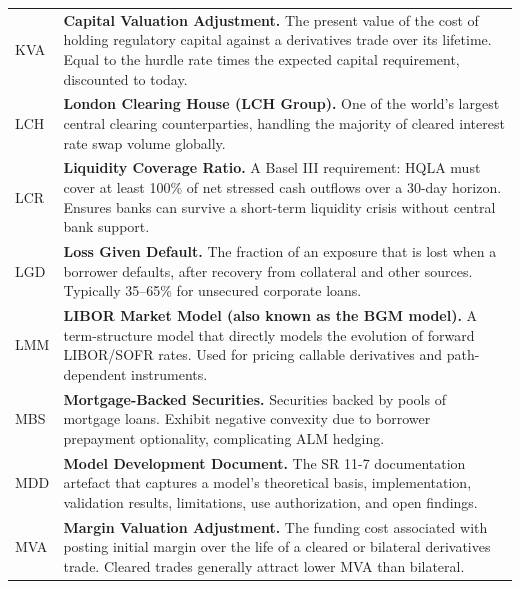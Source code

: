 \documentclass[12pt,a4paper]{article}
\begin{document}
\begin{longtable}{p{3.2cm} p{10.8cm}}
  KVA   & \textbf{Capital Valuation Adjustment.}
          The present value of the cost of holding regulatory capital against
          a derivatives trade over its lifetime.  Equal to the hurdle rate
          times the expected capital requirement, discounted to today. \\[4pt]

  LCH   & \textbf{London Clearing House (LCH Group).}
          One of the world's largest central clearing counterparties,
          handling the majority of cleared interest rate swap volume globally. \\[4pt]

  LCR   & \textbf{Liquidity Coverage Ratio.}
          A Basel III requirement: HQLA must cover at least 100\% of net
          stressed cash outflows over a 30-day horizon.  Ensures banks can
          survive a short-term liquidity crisis without central bank support. \\[4pt]

  LGD   & \textbf{Loss Given Default.}
          The fraction of an exposure that is lost when a borrower defaults,
          after recovery from collateral and other sources.  Typically
          35--65\% for unsecured corporate loans. \\[4pt]

  LMM   & \textbf{LIBOR Market Model (also known as the BGM model).}
          A term-structure model that directly models the evolution of
          forward LIBOR/SOFR rates.  Used for pricing callable derivatives
          and path-dependent instruments. \\[4pt]

  MBS   & \textbf{Mortgage-Backed Securities.}
          Securities backed by pools of mortgage loans.  Exhibit negative
          convexity due to borrower prepayment optionality, complicating
          ALM hedging. \\[4pt]

  MDD   & \textbf{Model Development Document.}
          The SR 11-7 documentation artefact that captures a model's
          theoretical basis, implementation, validation results, limitations,
          use authorization, and open findings. \\[4pt]

  MVA   & \textbf{Margin Valuation Adjustment.}
          The funding cost associated with posting initial margin over the
          life of a cleared or bilateral derivatives trade.
          Cleared trades generally attract lower MVA than bilateral. \\[4pt]


\end{longtable}
\end{document}
